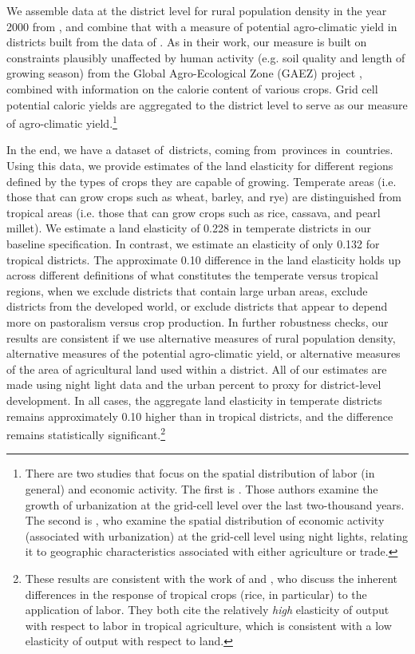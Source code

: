 \documentclass[11pt]{article}
\begin{document}
We assemble data at the district level for rural population density in the year 2000 from \citet{hyde31}, and combine that with a measure of potential agro-climatic yield in districts built from the data of \citet{galorozak2016}. As in their work, our measure is built on constraints plausibly unaffected by human activity (e.g. soil quality and length of growing season) from the Global Agro-Ecological Zone (GAEZ) project \citep{gaez}, combined with information on the calorie content of various crops. Grid cell potential caloric yields are aggregated to the district level to serve as our measure of agro-climatic yield.\footnote{There are two studies that focus on the spatial distribution of labor (in general) and economic activity. The first is \citet{mfm2014}. Those authors examine the growth of urbanization at the grid-cell level over the last two-thousand years. The second is \citet{hssw2016}, who examine the spatial distribution of economic activity (associated with urbanization) at the grid-cell level using night lights, relating it to geographic characteristics associated with either agriculture or trade.}

In the end, we have a dataset of\districts \ districts, coming from\provinces \ provinces in\countries \ countries. Using this data, we provide estimates of the land elasticity for different regions defined by the types of crops they are capable of growing. Temperate areas (i.e. those that can grow crops such as wheat, barley, and rye) are distinguished from tropical areas (i.e. those that can grow crops such as rice, cassava, and pearl millet). We estimate a land elasticity of 0.228 in temperate districts in our baseline specification. In contrast, we estimate an elasticity of only 0.132 for tropical districts. The approximate 0.10 difference in the land elasticity holds up across different definitions of what constitutes the temperate versus tropical regions, when we exclude districts that contain large urban areas, exclude districts from the developed world, or exclude districts that appear to depend more on pastoralism versus crop production. In further robustness checks, our results are consistent if we use alternative measures of rural population density, alternative measures of the potential agro-climatic yield, or alternative measures of the area of agricultural land used within a district. All of our estimates are made using night light data and the urban percent to proxy for district-level development. In all cases, the aggregate land elasticity in temperate districts remains approximately 0.10 higher than in tropical districts, and the difference remains statistically significant.\footnote{These results are consistent with the work of \citet{Ruthenberg:1976zr} and \citet{bray1994}, who discuss the inherent differences in the response of tropical crops (rice, in particular) to the application of labor. They both cite the relatively \textit{high} elasticity of output with respect to labor in tropical agriculture, which is consistent with a low elasticity of output with respect to land.} 
\end{document}

